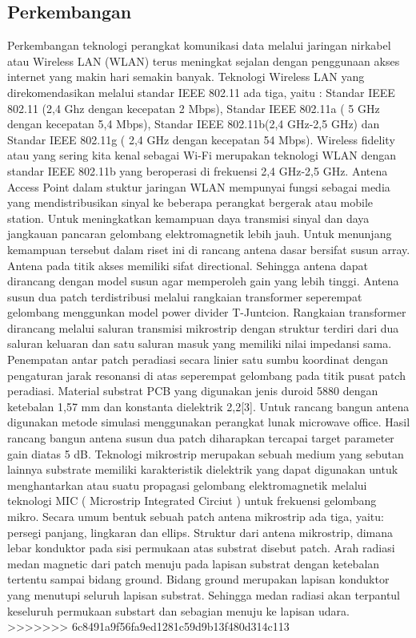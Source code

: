 \subsection {Perkembangan}
Perkembangan teknologi perangkat komunikasi data melalui jaringan nirkabel atau Wireless LAN (WLAN) terus meningkat sejalan dengan penggunaan akses internet yang makin hari semakin banyak. Teknologi Wireless LAN yang direkomendasikan melalui standar IEEE 802.11 ada tiga, yaitu : Standar IEEE 802.11 (2,4 Ghz dengan kecepatan 2 Mbps), Standar IEEE 802.11a ( 5 GHz dengan kecepatan 5,4 Mbps), Standar IEEE 802.11b(2,4 GHz-2,5 GHz) dan Standar IEEE 802.11g ( 2,4 GHz dengan kecepatan 54 Mbps). Wireless fidelity atau yang sering kita kenal sebagai Wi-Fi merupakan teknologi WLAN dengan standar IEEE 802.11b yang beroperasi di frekuensi 2,4 GHz-2,5 GHz. Antena Access Point dalam stuktur jaringan WLAN mempunyai fungsi sebagai media yang mendistribusikan sinyal ke beberapa perangkat bergerak atau mobile station. Untuk meningkatkan kemampuan daya transmisi sinyal dan daya jangkauan pancaran gelombang elektromagnetik lebih jauh.   Untuk menunjang kemampuan tersebut dalam riset ini di rancang antena dasar bersifat susun array. Antena pada titik akses memiliki sifat directional. Sehingga antena dapat dirancang dengan model susun agar memperoleh gain yang lebih tinggi.  Antena susun dua patch terdistribusi melalui rangkaian transformer seperempat gelombang menggunkan model power divider T-Juntcion. Rangkaian transformer dirancang melalui saluran transmisi mikrostrip dengan struktur terdiri dari dua saluran keluaran dan satu saluran masuk yang memiliki nilai impedansi sama. Penempatan antar patch peradiasi secara linier satu sumbu koordinat dengan pengaturan jarak resonansi di atas seperempat gelombang pada titik pusat patch peradiasi. Material substrat PCB yang digunakan jenis duroid 5880 dengan ketebalan 1,57 mm dan konstanta dielektrik 2,2[3]. Untuk rancang bangun antena digunakan metode simulasi menggunakan perangkat lunak microwave office. Hasil rancang bangun antena susun dua patch diharapkan tercapai target parameter gain diatas 5 dB.  Teknologi mikrostrip merupakan sebuah medium yang sebutan lainnya substrate memiliki karakteristik dielektrik yang dapat digunakan untuk menghantarkan atau suatu propagasi gelombang elektromagnetik melalui teknologi MIC ( Microstrip Integrated Circiut ) untuk frekuensi gelombang mikro. Secara umum bentuk sebuah patch antena mikrostrip ada tiga, yaitu: persegi panjang, lingkaran dan ellips. Struktur dari antena mikrostrip, dimana lebar konduktor pada sisi permukaan atas substrat disebut patch.   Arah radiasi medan magnetic dari patch menuju pada lapisan substrat dengan ketebalan tertentu sampai bidang ground. Bidang ground merupakan lapisan konduktor yang menutupi seluruh lapisan substrat. Sehingga medan radiasi akan terpantul keseluruh permukaan substart dan sebagian menuju ke lapisan udara. 
>>>>>>> 6c8491a9f56fa9ed1281c59d9b13f480d314c113

